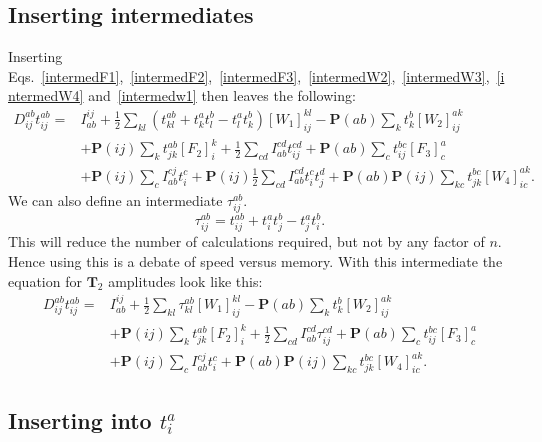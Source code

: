 \documentclass[graybox,sectrefs,envcountresetchap,open=right]{svmonodo}
\begin{document}
\subsection{Inserting intermediates}
Inserting Eqs.~\ref{intermedF1},~\ref{intermedF2},~\ref{intermedF3},~\ref{intermedW2},~\ref{intermedW3},~\ref{intermedW4} and~\ref{intermedw1} then leaves the following:
\begin{align}
D_{ij}^{ab} t_{ij}^{ab} = & 
I_{ab}^{ij} +
\frac{1}{2} \sum_{kl} (t_{kl}^{ab} + t_k^a t_l^b - t_l^a t_k^b) [W_1]_{ij}^{kl}
- \mathbf{P}(ab) \sum_k t_k^b [W_2]_{ij}^{ak}
\nonumber \\ &
+ \mathbf{P}(ij) \sum_k t_{jk}^{ab} [F_2]_i^k
+ \frac{1}{2} \sum_{cd} I_{ab}^{cd} t_{ij}^{cd}
+ \mathbf{P}(ab) \sum_c t_{ij}^{bc} [F_3]_c^a
\nonumber \\ &
+ \mathbf{P}(ij) \sum_c I_{ab}^{cj} t_i^c
+ \mathbf{P}(ij) \frac{1}{2} \sum_{cd} I_{ab}^{cd} t_i^c t_j^d 
+ \mathbf{P}(ab) \mathbf{P}(ij) \sum_{kc} t_{jk}^{bc} [W_4]_{ic}^{ak} .
\end{align}
We can also define an intermediate $\tau_{ij}^{ab}$.
\begin{equation}
\tau_{ij}^{ab} = t_{ij}^{ab} + t_i^a t_j^b - t_j^a t_i^b . \label{intermedtau}
\end{equation}
This will reduce the number of calculations required, but not by any factor of $n$. Hence using this is a debate of speed versus memory. With this intermediate the equation for $\mathbf{T}_2$ amplitudes look like this:
\begin{align}
D_{ij}^{ab} t_{ij}^{ab} = & 
I_{ab}^{ij} +
\frac{1}{2} \sum_{kl} \tau_{kl}^{ab} [W_1]_{ij}^{kl}
- \mathbf{P}(ab) \sum_k t_k^b [W_2]_{ij}^{ak}
\nonumber \\ &
+ \mathbf{P}(ij) \sum_k t_{jk}^{ab} [F_2]_i^k
+ \frac{1}{2} \sum_{cd} I_{ab}^{cd} \tau_{ij}^{cd}
+ \mathbf{P}(ab) \sum_c t_{ij}^{bc} [F_3]_c^a
\nonumber \\ &
+ \mathbf{P}(ij) \sum_c I_{ab}^{cj} t_i^c
+ \mathbf{P}(ab) \mathbf{P}(ij) \sum_{kc} t_{jk}^{bc} [W_4]_{ic}^{ak} . \label{LINK_THIS_SHIT_1_T2}
\end{align}
\subsection{Inserting into $t_i^a$}
\end{document}
